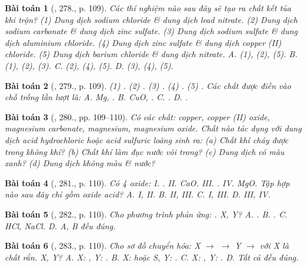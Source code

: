 \documentclass{article}
\newtheorem{baitoan}{Bài toán}
\begin{document}
\begin{baitoan}[\cite{Nguyen_Buu_Can_500_BT_Hoa_Hoc_THCS}, 278., p. 109]
	Các thí nghiệm nào sau đây sẽ tạo ra chất kết tủa khi trộn? (1) Dung dịch sodium chloride \& dung dịch lead nitrate. (2) Dung dịch sodium carbonate \& dung dịch zinc sulfate. (3) Dung dịch sodium sulfate \& dung dịch aluminium chloride. (4) Dung dịch zinc sulfate \& dung dịch copper ({\rm II}) chloride. (5) Dung dịch barium chloride \& dung dịch nitrate. {\sf A.} (1), (2), (5). {\sf B.} (1), (2), (3). {\sf C.} (2), (4), (5). {\sf D.} (3), (4), (5).
\end{baitoan}

\begin{baitoan}[\cite{Nguyen_Buu_Can_500_BT_Hoa_Hoc_THCS}, 279., p. 109]
	{\rm(1) . (2) . (3) . (4) . (5) .} Các chất được điền vào chỗ trống lần lượt là: {\rm{\sf A.} Mg, . {\sf B.} CuO, . {\sf C.} . {\sf D.} .}
\end{baitoan}

\begin{baitoan}[\cite{Nguyen_Buu_Can_500_BT_Hoa_Hoc_THCS}, 280., pp. 109--110]
	Có các chất: copper, copper ({\rm II}) oxide, magnesium carbonate, magnesium, magnesium oxide. Chất nào tác dụng với dung dịch acid hydrochloric hoặc acid sulfuric loãng sinh ra: (a) Chất khí cháy được trong không khí? (b) Chất khí làm đục nước vôi trong? (c) Dung dịch có màu xanh? (d) Dung dịch không màu \& nước?
\end{baitoan}

\begin{baitoan}[\cite{Nguyen_Buu_Can_500_BT_Hoa_Hoc_THCS}, 281., p. 110]
	Có 4 oxide: {\rm I. . II. CaO. III. . IV. MgO}. Tập hợp nào sau đây chỉ gồm oxide acid? {\rm{\sf A.} I, II. {\sf B.} II, III. {\sf C.} I, III. {\sf D.} III, IV}.
\end{baitoan}

\begin{baitoan}[\cite{Nguyen_Buu_Can_500_BT_Hoa_Hoc_THCS}, 282., p. 110]
	Cho phương trình phản ứng: {\rm{}}. X, Y? {\rm{\sf A.} . {\sf B.} . {\sf C.} HCl, NaCl. {\sf D.} A, B đều đúng.}
\end{baitoan}

\begin{baitoan}[\cite{Nguyen_Buu_Can_500_BT_Hoa_Hoc_THCS}, 283., p. 110]
	Cho sơ đồ chuyển hóa: {\rm X $\to$  $\to$ Y $\to$ } với X là chất rắn. X, Y? {\rm{\sf A.} X: , Y: . {\sf B.} X:  hoặc S, Y: . {\rm C.} X: , Y: .} {\sf D.} Tất cả đều đúng.
\end{baitoan}
\end{document}
